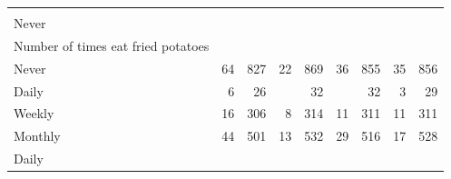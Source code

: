 \documentclass{article}
\begin{document}
\begin{table}[!h]
{\begin{tabular}{lllllllll}
			\multicolumn{1}{|r}{} &
			\multicolumn{1}{r}{} &
			\multicolumn{1}{r}{} &
			\multicolumn{1}{r}{} &
			\multicolumn{1}{r}{} &
			\multicolumn{1}{r}{} &
			\multicolumn{1}{r}{} &
			\multicolumn{1}{r}{} \\
			\multicolumn{1}{l}{\hspace{3em}Never} &
			\multicolumn{1}{|r}{} &
			\multicolumn{1}{r}{} &
			\multicolumn{1}{r}{} &
			\multicolumn{1}{r}{} &
			\multicolumn{1}{r}{} &
			\multicolumn{1}{r}{} &
			\multicolumn{1}{r}{} &
			\multicolumn{1}{r}{} \\
			\multicolumn{1}{l}{\hspace{4em}Number of times eat fried potatoes} &
			\multicolumn{1}{|r}{} &
			\multicolumn{1}{r}{} &
			\multicolumn{1}{r}{} &
			\multicolumn{1}{r}{} &
			\multicolumn{1}{r}{} &
			\multicolumn{1}{r}{} &
			\multicolumn{1}{r}{} &
			\multicolumn{1}{r}{} \\
			\multicolumn{1}{l}{\hspace{5em}Never} &
			\multicolumn{1}{|r}{64} &
			\multicolumn{1}{r}{827} &
			\multicolumn{1}{r}{22} &
			\multicolumn{1}{r}{869} &
			\multicolumn{1}{r}{36} &
			\multicolumn{1}{r}{855} &
			\multicolumn{1}{r}{35} &
			\multicolumn{1}{r}{856} \\
			\multicolumn{1}{l}{\hspace{5em}Daily} &
			\multicolumn{1}{|r}{6} &
			\multicolumn{1}{r}{26} &
			\multicolumn{1}{r}{} &
			\multicolumn{1}{r}{32} &
			\multicolumn{1}{r}{} &
			\multicolumn{1}{r}{32} &
			\multicolumn{1}{r}{3} &
			\multicolumn{1}{r}{29} \\
			\multicolumn{1}{l}{\hspace{5em}Weekly} &
			\multicolumn{1}{|r}{16} &
			\multicolumn{1}{r}{306} &
			\multicolumn{1}{r}{8} &
			\multicolumn{1}{r}{314} &
			\multicolumn{1}{r}{11} &
			\multicolumn{1}{r}{311} &
			\multicolumn{1}{r}{11} &
			\multicolumn{1}{r}{311} \\
			\multicolumn{1}{l}{\hspace{5em}Monthly} &
			\multicolumn{1}{|r}{44} &
			\multicolumn{1}{r}{501} &
			\multicolumn{1}{r}{13} &
			\multicolumn{1}{r}{532} &
			\multicolumn{1}{r}{29} &
			\multicolumn{1}{r}{516} &
			\multicolumn{1}{r}{17} &
			\multicolumn{1}{r}{528} \\
			\multicolumn{1}{l}{\hspace{3em}Daily} &
			\multicolumn{1}{|r}{} &
			\multicolumn{1}{r}{} &
			\multicolumn{1}{r}{} &
			\multicolumn{1}{r}{} &
			\multicolumn{1}{r}{} &
			\multicolumn{1}{r}{} &
			\multicolumn{1}{r}{} &

\end{tabular}}
\end{table}
\end{document}
